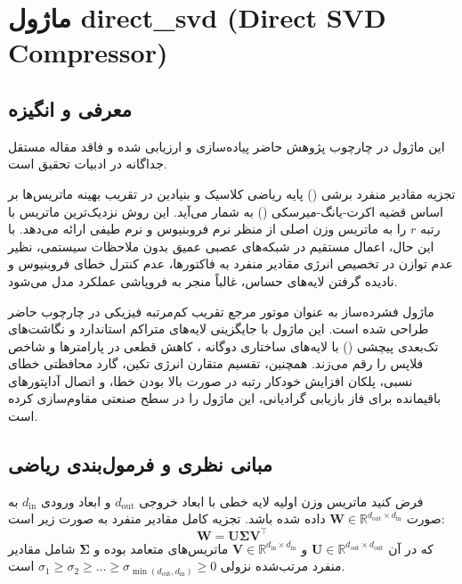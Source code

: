 \section{ماژول direct\_svd (Direct SVD Compressor)}
\label{sec:module_direct_svd}

\subsection{معرفی و انگیزه}
این ماژول در چارچوب پژوهش حاضر پیاده‌سازی و ارزیابی شده و فاقد مقاله مستقل جداگانه در ادبیات تحقیق است.

تجزیه مقادیر منفرد برشی () پایه ریاضی کلاسیک و بنیادین در تقریب بهینه ماتریس‌ها بر اساس قضیه اکرت-یانگ-میرسکی () به شمار می‌آید. این روش نزدیک‌ترین ماتریس با رتبه $r$ را به ماتریس وزن اصلی از منظر نرم فروبنیوس و نرم طیفی ارائه می‌دهد. با این حال، اعمال مستقیم  در شبکه‌های عصبی عمیق بدون ملاحظات سیستمی، نظیر عدم توازن در تخصیص انرژی مقادیر منفرد به فاکتورها، عدم کنترل خطای فروبنیوس و نادیده گرفتن لایه‌های حساس، غالباً منجر به فروپاشی عملکرد مدل می‌شود.

ماژول فشرده‌ساز  به عنوان موتور مرجع تقریب کم‌مرتبه فیزیکی در چارچوب حاضر طراحی شده است. این ماژول با جایگزینی لایه‌های متراکم استاندارد و نگاشت‌های تک‌بعدی پیچشی () با لایه‌های ساختاری دوگانه ، کاهش قطعی در پارامترها و شاخص فلاپس را رقم می‌زند. همچنین، تقسیم متقارن انرژی تکین، گارد محافظتی خطای نسبی، پلکان افزایش خودکار رتبه در صورت بالا بودن خطا، و اتصال آداپتورهای باقیمانده  برای فاز بازیابی گرادیانی، این ماژول را در سطح صنعتی مقاوم‌سازی کرده است.

\subsection{مبانی نظری و فرمول‌بندی ریاضی}
فرض کنید ماتریس وزن اولیه لایه خطی با ابعاد خروجی $d_{\text{out}}$ و ابعاد ورودی $d_{\text{in}}$ به صورت $\mathbf{W} \in \mathbb{R}^{d_{\text{out}} \times d_{\text{in}}}$ داده شده باشد. تجزیه کامل مقادیر منفرد به صورت زیر است:
\begin{equation}
\mathbf{W} = \mathbf{U} \mathbf{\Sigma} \mathbf{V}^\top
\end{equation}
که در آن $\mathbf{U} \in \mathbb{R}^{d_{\text{out}} \times d_{\text{out}}}$ و $\mathbf{V} \in \mathbb{R}^{d_{\text{in}} \times d_{\text{in}}}$ ماتریس‌های متعامد بوده و $\mathbf{\Sigma}$ شامل مقادیر منفرد مرتب‌شده نزولی $\sigma_1 \ge \sigma_2 \ge \dots \ge \sigma_{\min(d_{\text{out}}, d_{\text{in}})} \ge 0$ است.

